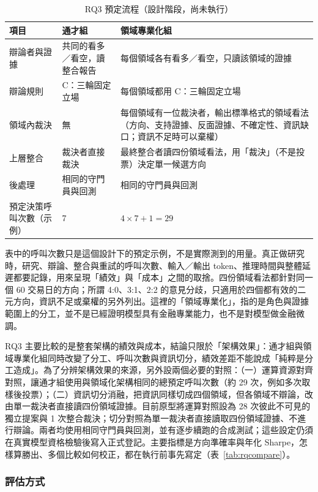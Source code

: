 \documentclass[12pt,a4paper]{article}
\numberwithin{table}{section}
\numberwithin{figure}{section}
\begin{document}
\begin{table}[H]\centering\small
\caption{RQ3 預定流程（設計階段，尚未執行）}
\label{tab:rq3flow}
\begin{tabularx}{\textwidth}{@{}L{.17} Y Y@{}}\toprule
項目 & 通才組 & 領域專業化組 \\\midrule
辯論者與證據 & 共同的看多／看空，讀整合報告 & 每個領域各有看多／看空，只讀該領域的證據 \\
辯論規則 & C：三輪固定立場 & 每個領域都用 C：三輪固定立場 \\
領域內裁決 & 無 & 每個領域有一位裁決者，輸出標準格式的領域看法（方向、支持證據、反面證據、不確定性、資訊缺口；資訊不足時可以棄權） \\
上層整合 & 裁決者直接裁決 & 最終整合者讀四份領域看法，用「裁決」（不是投票）決定單一候選方向 \\
後處理 & 相同的守門員與回測 & 相同的守門員與回測 \\
預定決策呼叫次數（示例） & 7 & $4\times7+1=29$ \\
\bottomrule\end{tabularx}\end{table}

表中的呼叫次數只是這個設計下的預定示例，不是實際測到的用量。真正做研究時，研究、辯論、整合與重試的呼叫次數、輸入／輸出 token、推理時間與整體延遲都要記錄，用來呈現「績效」與「成本」之間的取捨。四份領域看法都針對同一個 60 交易日的方向；所謂 4:0、3:1、2:2 的意見分歧，只適用於四個都有效的二元方向，資訊不足或棄權的另外列出。這裡的「領域專業化」，指的是角色與證據範圍上的分工，並不是已經證明模型具有金融專業能力，也不是對模型做金融微調。

RQ3 主要比較的是整套架構的績效與成本，結論只限於「架構效果」：通才組與領域專業化組同時改變了分工、呼叫次數與資訊切分，績效差距不能說成「純粹是分工造成」。為了分辨架構效果的來源，另外設兩個必要的對照：（一）運算資源對齊對照，讓通才組使用與領域化架構相同的總預定呼叫次數（約 29 次，例如多次取樣後投票）；（二）資訊切分消融，把資訊同樣切成四個領域，但各領域不辯論，改由單一裁決者直接讀四份領域證據。目前原型將運算對照設為 28 次彼此不可見的獨立提案與 1 次整合裁決；切分對照為單一裁決者直接讀取四份領域證據、不進行辯論。兩者均使用相同守門員與回測，並有逐步續跑的合成測試；這些設定仍須在真實模型資格檢驗後寫入正式登記。主要指標是方向準確率與年化 Sharpe，怎樣算勝出、多個比較如何校正，都在執行前事先寫定（表~\ref{tab:rqcompare}）。

\subsubsection{評估方式}
\end{document}
